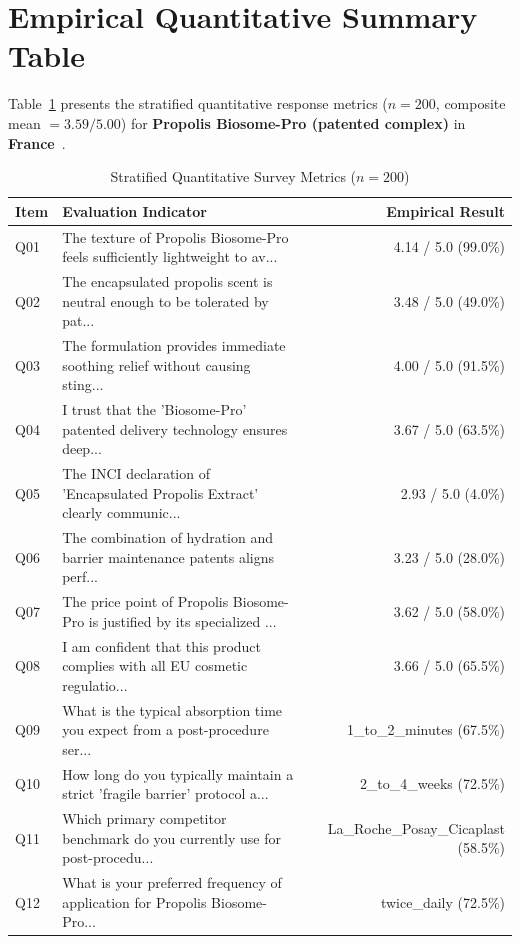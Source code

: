 \documentclass[10pt,twocolumn,a4paper]{article}
\begin{document}
\section{Empirical Quantitative Summary Table}
Table~\ref{tab:metrics} presents the stratified quantitative response metrics ($n = 200$, composite mean $= 3.59/5.00$) for \textbf{Propolis Biosome-Pro (patented complex)} in \textbf{France}~\cite{ref_kaggle_doi,ref_hf_doi}.

\begin{table}[t]
\centering
\caption{Stratified Quantitative Survey Metrics ($n = 200$)}
\label{tab:metrics}
\small
\begin{tabularx}{\textwidth}{l X r}
\toprule
\textbf{Item} & \textbf{Evaluation Indicator} & \textbf{Empirical Result} \\
\midrule
Q01 & The texture of Propolis Biosome-Pro feels sufficiently lightweight to av... & 4.14 / 5.0 (99.0\%) \\
Q02 & The encapsulated propolis scent is neutral enough to be tolerated by pat... & 3.48 / 5.0 (49.0\%) \\
Q03 & The formulation provides immediate soothing relief without causing sting... & 4.00 / 5.0 (91.5\%) \\
Q04 & I trust that the 'Biosome-Pro' patented delivery technology ensures deep... & 3.67 / 5.0 (63.5\%) \\
Q05 & The INCI declaration of 'Encapsulated Propolis Extract' clearly communic... & 2.93 / 5.0 (4.0\%) \\
Q06 & The combination of hydration and barrier maintenance patents aligns perf... & 3.23 / 5.0 (28.0\%) \\
Q07 & The price point of Propolis Biosome-Pro is justified by its specialized ... & 3.62 / 5.0 (58.0\%) \\
Q08 & I am confident that this product complies with all EU cosmetic regulatio... & 3.66 / 5.0 (65.5\%) \\
Q09 & What is the typical absorption time you expect from a post-procedure ser... & 1\_to\_2\_minutes (67.5\%) \\
Q10 & How long do you typically maintain a strict 'fragile barrier' protocol a... & 2\_to\_4\_weeks (72.5\%) \\
Q11 & Which primary competitor benchmark do you currently use for post-procedu... & La\_Roche\_Posay\_Cicaplast (58.5\%) \\
Q12 & What is your preferred frequency of application for Propolis Biosome-Pro... & twice\_daily (72.5\%) \\

\end{tabularx}
\end{table}
\end{document}
